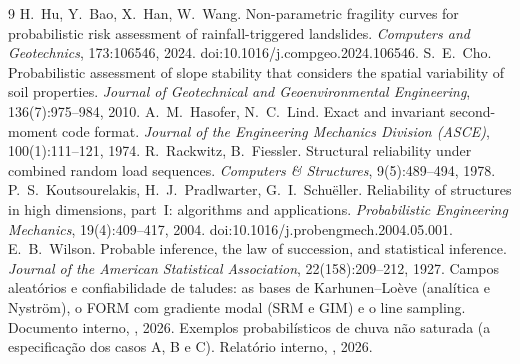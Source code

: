 \documentclass[11pt,a4paper]{article}
\begin{document}
\begin{thebibliography}{9}
 H.~Hu, Y.~Bao, X.~Han, W.~Wang. Non-parametric fragility curves for probabilistic risk assessment
  of rainfall-triggered landslides. \emph{Computers and Geotechnics}, 173:106546, 2024.
  doi:10.1016/j.compgeo.2024.106546.
 S.~E.~Cho. Probabilistic assessment of slope stability that considers the spatial variability of
  soil properties. \emph{Journal of Geotechnical and Geoenvironmental Engineering}, 136(7):975--984, 2010.
 A.~M.~Hasofer, N.~C.~Lind. Exact and invariant second-moment code format. \emph{Journal of the
  Engineering Mechanics Division (ASCE)}, 100(1):111--121, 1974.
 R.~Rackwitz, B.~Fiessler. Structural reliability under combined random load sequences.
  \emph{Computers \& Structures}, 9(5):489--494, 1978.
 P.~S.~Koutsourelakis, H.~J.~Pradlwarter, G.~I.~Schuëller. Reliability of structures in
  high dimensions, part~I: algorithms and applications. \emph{Probabilistic Engineering Mechanics}, 19(4):409--417,
  2004. doi:10.1016/j.probengmech.2004.05.001.
 E.~B.~Wilson. Probable inference, the law of succession, and statistical inference.
  \emph{Journal of the American Statistical Association}, 22(158):209--212, 1927.
 Campos aleatórios e confiabilidade de taludes: as bases de Karhunen--Loève (analítica e Nyström),
  o FORM com gradiente modal (SRM e GIM) e o line sampling. Documento interno,
  , 2026.
 Exemplos probabilísticos de chuva não saturada (a especificação dos casos A, B e C). Relatório
  interno, , 2026.
\end{thebibliography}

\appendix
\end{document}
